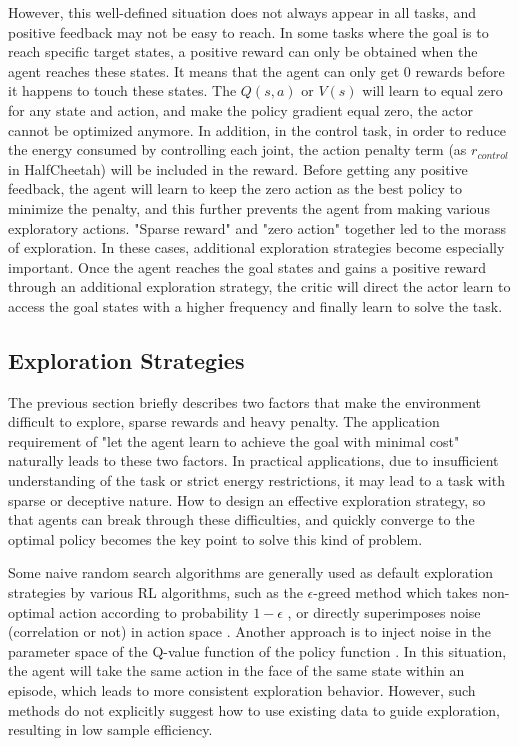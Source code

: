 However, this well-defined situation does not always appear in all tasks, and positive feedback may not be easy to reach. In some tasks where the goal is to reach specific target states, a positive reward can only be obtained when the agent reaches these states. It means that the agent can only get 0 rewards before it happens to touch these states. The $Q(s,a)$ or $V(s)$ will learn to equal zero for any state and action, and make the policy gradient equal zero, the actor cannot be optimized anymore. In addition, in the control task, in order to reduce the energy consumed by controlling each joint, the action penalty term (as $r_{control}$ in HalfCheetah) will be included in the reward. Before getting any positive feedback, the agent will learn to keep the zero action as the best policy to minimize the penalty, and this further prevents the agent from making various exploratory actions. "Sparse reward" and "zero action" together led to the morass of exploration. In these cases, additional exploration strategies become especially important. Once the agent reaches the goal states and gains a positive reward through an additional exploration strategy, the critic will direct the actor learn to access the goal states with a higher frequency and finally learn to solve the task.

\subsection{Exploration Strategies}
The previous section briefly describes two factors that make the environment difficult to explore, sparse rewards and heavy penalty. The application requirement of "let the agent learn to achieve the goal with minimal cost" naturally leads to these two factors. In practical applications, due to insufficient understanding of the task or strict energy restrictions, it may lead to a task with sparse or deceptive nature. How to design an effective exploration strategy, so that agents can break through these difficulties, and quickly converge to the optimal policy becomes the key point to solve this kind of problem.

Some naive random search algorithms are generally used as default exploration strategies by various RL algorithms, such as the $\epsilon$-greed method which takes non-optimal action according to probability $1-\epsilon$ \cite{DQN}, or directly superimposes noise (correlation or not) in action space \cite{DDPG}. Another approach is to inject noise in the parameter space of the Q-value function of the policy function \cite{pnoise}. In this situation, the agent will take the same action in the face of the same state within an episode, which leads to more consistent exploration behavior. However, such methods do not explicitly suggest how to use existing data to guide exploration, resulting in low sample efficiency. 

